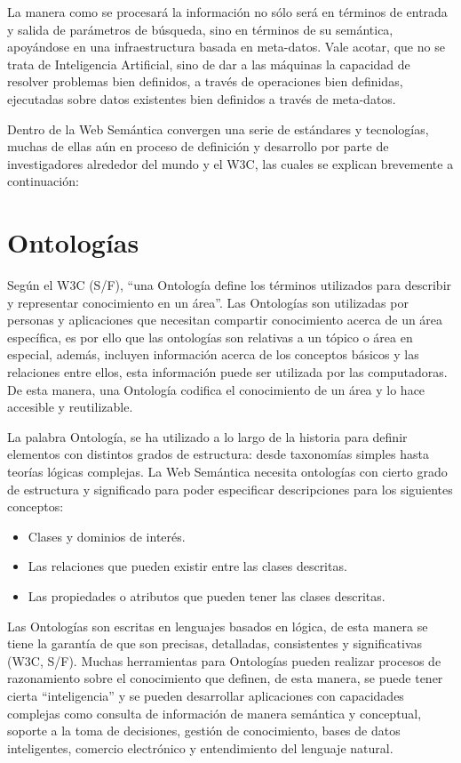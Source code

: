 La manera como se procesará la información no sólo será en términos de entrada y salida de parámetros de búsqueda, sino en términos de su semántica, apoyándose en una infraestructura basada en meta-datos. Vale acotar, que no se trata de Inteligencia Artificial, sino de dar a las máquinas la capacidad de resolver problemas bien definidos, a través de operaciones bien definidas, ejecutadas sobre datos existentes bien definidos a través de meta-datos.

Dentro de la Web Semántica convergen una serie de estándares y tecnologías, muchas de ellas aún en proceso de definición y desarrollo por parte de investigadores alrededor del mundo y el W3C, las cuales se explican brevemente a continuación:

\section{Ontologías}

Según el W3C (S/F), ``una Ontología define los términos utilizados para describir y representar conocimiento en un área''. Las Ontologías son utilizadas por personas y aplicaciones que necesitan compartir conocimiento acerca de un área específica, es por ello que las ontologías son relativas a un tópico o área en especial, además, incluyen información acerca de los conceptos básicos y las relaciones entre ellos, esta información puede ser utilizada por las computadoras. De esta manera, una Ontología codifica el conocimiento de un área y lo hace accesible y reutilizable.

La palabra Ontología, se ha utilizado a lo largo de la historia para definir elementos con distintos grados de estructura: desde taxonomías simples hasta teorías lógicas complejas. La Web Semántica necesita ontologías con cierto grado de estructura y significado para poder especificar descripciones para los siguientes conceptos:

\begin{itemize}
\item Clases y dominios de interés.
\item Las relaciones que pueden existir entre las clases descritas.
\item Las propiedades o atributos que pueden tener las clases descritas.
\end{itemize}

Las Ontologías son escritas en lenguajes basados en lógica, de esta manera se tiene la garantía de que son precisas, detalladas, consistentes y significativas (W3C, S/F). Muchas herramientas para Ontologías pueden realizar procesos de razonamiento sobre el conocimiento que definen, de esta manera, se puede tener cierta ``inteligencia'' y se pueden desarrollar aplicaciones con capacidades complejas como consulta de información de manera semántica y conceptual, soporte a la toma de decisiones, gestión de conocimiento, bases de datos inteligentes, comercio electrónico y entendimiento del lenguaje natural.

